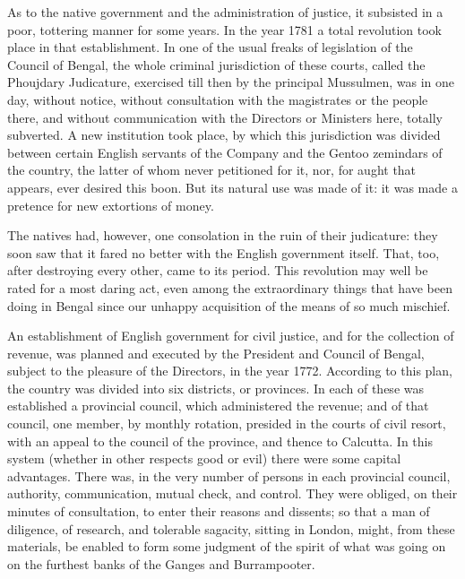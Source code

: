 As to the native government and the administration of justice, it subsisted in a poor, tottering manner for some years. In the year 1781 a total revolution took place in that establishment. In one of the usual freaks of legislation of the Council of Bengal, the whole criminal jurisdiction of these courts, called the Phoujdary Judicature, exercised till then by the principal Mussulmen, was in one day, without notice, without consultation with the magistrates or the people there, and without communication with the Directors or Ministers here, totally subverted. A new institution took place, by which this jurisdiction was divided between certain English servants of the Company and the Gentoo zemindars of the country, the latter of whom never petitioned for it, nor, for aught that appears, ever desired this boon. But its natural use was made of it: it was made a pretence for new extortions of money.

The natives had, however, one consolation in the ruin of their judicature: they soon saw that it fared no better with the English government itself. That, too, after destroying every other, came to its period. This revolution may well be rated for a most daring act, even among the extraordinary things that have been doing in Bengal since our unhappy acquisition of the means of so much mischief.

An establishment of English government for civil justice, and for the collection of revenue, was planned and executed by the President and Council of Bengal, subject to the pleasure of the Directors, in the year 1772. According to this plan, the country was divided into six districts, or provinces. In each of these was established a provincial council, which administered the revenue; and of that council, one member, by monthly rotation, presided in the courts of civil resort, with an appeal to the council of the province, and thence to Calcutta. In this system (whether in other respects good or evil) there were some capital advantages. There was, in the very number of persons in each provincial council, authority, communication, mutual check, and control. They were obliged, on their minutes of consultation, to enter their reasons and dissents; so that a man of diligence, of research, and tolerable sagacity, sitting in London, might, from these materials, be enabled to form some judgment of the spirit of what was going on on the furthest banks of the Ganges and Burrampooter.

